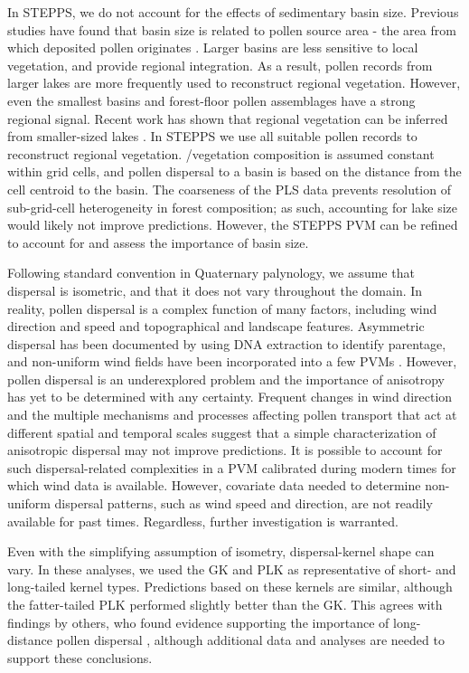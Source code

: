 \documentclass[12pt]{article}
\begin{document}
In STEPPS, we do not account for the effects of sedimentary basin
size. Previous studies have found that basin size is related to pollen
source area - the area from which deposited pollen originates
\citep{jacobson1981selection, prentice1985pollen,
  sugita1994pollen}. Larger basins are less sensitive to local
vegetation, and provide regional integration. As a result, pollen
records from larger lakes are more frequently used to reconstruct
regional vegetation. However, even the smallest basins
\citep{jackson1990} and forest-floor pollen assemblages
\citep{jackson1998quantitative, calcote1995pollen} have a strong
regional signal. Recent work has shown that regional vegetation can be
inferred from smaller-sized lakes \citep{trondmanpollen}. In STEPPS we
use all suitable pollen records to reconstruct regional
vegetation. /vegetation composition is assumed constant within grid
cells, and pollen dispersal to a basin is based on the distance from
the cell centroid to the basin. The coarseness of the PLS data
prevents resolution of sub-grid-cell heterogeneity in forest
composition; as such, accounting for lake size would likely not
improve predictions. However, the STEPPS PVM can be refined to account
for and assess the importance of basin size.

Following standard convention in Quaternary palynology, we assume that
dispersal is isometric, and that it does not vary throughout the
domain. In reality, pollen dispersal is a complex function of many
factors, including wind direction and speed and topographical and
landscape features. Asymmetric dispersal has been documented by
\citet{robledo2005patterns} using DNA extraction to identify
parentage, and non-uniform wind fields have been incorporated into a
few PVMs \citep{bunting2005modelling}. However, pollen dispersal is an
underexplored problem and the importance of anisotropy has yet to be
determined with any certainty. Frequent changes in wind direction and
the multiple mechanisms and processes affecting pollen transport that act at different spatial and
temporal scales suggest that a simple
characterization of anisotropic dispersal may not improve
predictions. It is possible to account for such dispersal-related
complexities in a PVM calibrated during modern times for which wind
data is available. However, covariate data needed to determine
non-uniform dispersal patterns, such as wind speed and direction, are
not readily available for past times. Regardless, further
investigation is warranted.

Even with the simplifying assumption of isometry, dispersal-kernel
shape can vary. In these analyses, we used the GK and PLK as
representative of short- and long-tailed kernel types. Predictions
based on these kernels are similar, although the fatter-tailed PLK
performed slightly better than the GK. This agrees with findings by
others, who found evidence supporting the importance of long-distance
pollen dispersal \citep{austerlitz2004using, macinnis2012measuring},
although additional data and analyses are needed to support these
conclusions.
\end{document}
